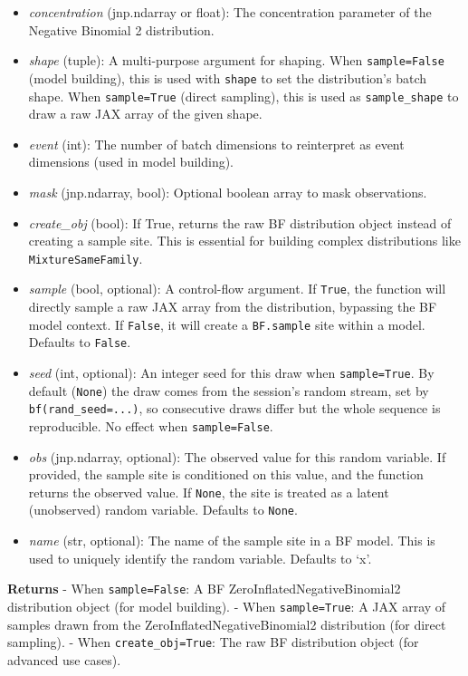 \documentclass[
  letterpaper,
  DIV=11,
  numbers=noendperiod]{scrartcl}
\begin{document}
\begin{itemize}
\item
  \emph{concentration} (jnp.ndarray or float): The concentration
  parameter of the Negative Binomial 2 distribution.
\item
  \emph{shape} (tuple): A multi-purpose argument for shaping. When
  \texttt{sample=False} (model building), this is used with
  \texttt{shape} to set the distribution's batch shape. When
  \texttt{sample=True} (direct sampling), this is used as
  \texttt{sample\_shape} to draw a raw JAX array of the given shape.
\item
  \emph{event} (int): The number of batch dimensions to reinterpret as
  event dimensions (used in model building).
\item
  \emph{mask} (jnp.ndarray, bool): Optional boolean array to mask
  observations.
\item
  \emph{create\_obj} (bool): If True, returns the raw BF distribution
  object instead of creating a sample site. This is essential for
  building complex distributions like \texttt{MixtureSameFamily}.
\item
  \emph{sample} (bool, optional): A control-flow argument. If
  \texttt{True}, the function will directly sample a raw JAX array from
  the distribution, bypassing the BF model context. If \texttt{False},
  it will create a \texttt{BF.sample} site within a model. Defaults to
  \texttt{False}.
\item
  \emph{seed} (int, optional): An integer seed for this draw when
  \texttt{sample=True}. By default (\texttt{None}) the draw comes from
  the session's random stream, set by \texttt{bf(rand\_seed=...)}, so
  consecutive draws differ but the whole sequence is reproducible. No
  effect when \texttt{sample=False}.
\item
  \emph{obs} (jnp.ndarray, optional): The observed value for this random
  variable. If provided, the sample site is conditioned on this value,
  and the function returns the observed value. If \texttt{None}, the
  site is treated as a latent (unobserved) random variable. Defaults to
  \texttt{None}.
\item
  \emph{name} (str, optional): The name of the sample site in a BF
  model. This is used to uniquely identify the random variable. Defaults
  to `x'.
\end{itemize}

\textbf{Returns} - When \texttt{sample=False}: A BF
ZeroInflatedNegativeBinomial2 distribution object (for model building).
- When \texttt{sample=True}: A JAX array of samples drawn from the
ZeroInflatedNegativeBinomial2 distribution (for direct sampling). - When
\texttt{create\_obj=True}: The raw BF distribution object (for advanced
use cases).
\end{document}
